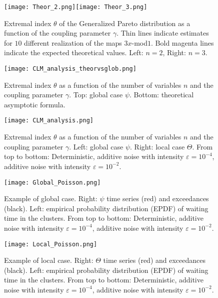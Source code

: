 \documentclass[12pt,reqno,a4paper]{amsart}
\let\epsilon\varepsilon
\begin{document}
\begin{figure}[t]
\texttt{[image: Theor\_2.png]}\texttt{[image: Theor\_3.png]}
\caption{Extremal index $\theta$ of the Generalized Pareto distribution as a function of the  coupling parameter $\gamma$. Thin lines indicate estimates for $10$ different realization of the maps $3x$-mod$ 1$. Bold magenta lines indicate the expected theoretical values. Left: $n=2$, Right: $n=3$.}
\label{d32}
\end{figure}

\begin{figure}[t]
\texttt{[image: CLM\_analysis\_theorvsglob.png]}
\caption{Extremal index $\theta$ as a function of the number of variables $n$ and the coupling parameter $\gamma$. Top:  global case $\psi$. Bottom: theoretical asymptotic formula.}
\label{CLM_t}
\end{figure}

\begin{figure}[t]
\texttt{[image: CLM\_analysis.png]}
\caption{Extremal index $\theta$ as a function of the number of variables $n$ and the coupling parameter $\gamma$. Left:  global case $\psi$. Right: local case  $\Theta$. From top to bottom: Deterministic, additive noise with intensity $\epsilon=10^{-4}$, additive noise with intensity $\epsilon=10^{-2}$.}
\label{CLM}
\end{figure}


\begin{figure}[t]
\texttt{[image: Global\_Poisson.png]}
\caption{Example of global case. Right: $\psi$  time series (red) and exceedances (black). Left: empirical probability distribution (EPDF) of waiting time in the clusters. From top to bottom: Deterministic, additive noise with intensity $\epsilon=10^{-4}$, additive noise with intensity $\epsilon=10^{-2}$.}
\label{global_Poisson}
\end{figure}


\begin{figure}[t]
\texttt{[image: Local\_Poisson.png]}
\caption{Example of local case. Right: $\Theta$ time series (red) and exceedances (black). Left: empirical probability distribution (EPDF) of waiting time in the clusters. From top to bottom: Deterministic, additive noise with intensity $\epsilon=10^{-4}$, additive noise with intensity $\epsilon=10^{-2}$.}
\label{local_Poisson}
\end{figure}
\end{document}
